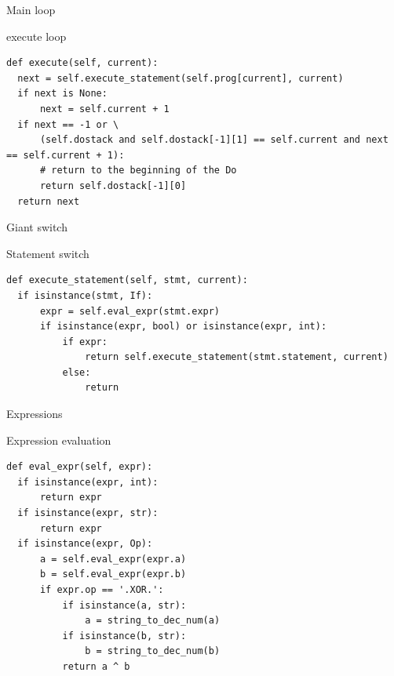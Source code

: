 \documentclass{beamer}
\def\py{
  \lstset{
     language=Python,
     extendedchars=true,
     basicstyle=\footnotesize\ttfamily,
     showstringspaces=false,
     showspaces=false,
     numbersep=9pt,
     tabsize=2,
     breaklines=true,
     showtabs=false,
     captionpos=b
  }
}
\begin{document}
\begin{frame}[fragile]{Main loop}

\begin{block}{execute loop}
\py
\begin{lstlisting}
def execute(self, current):
  next = self.execute_statement(self.prog[current], current)
  if next is None:
      next = self.current + 1
  if next == -1 or \
      (self.dostack and self.dostack[-1][1] == self.current and next == self.current + 1):
      # return to the beginning of the Do
      return self.dostack[-1][0]
  return next
\end{lstlisting}
\end{block}
\end{frame}

\begin{frame}[fragile]{Giant switch}

\begin{block}{Statement switch}
\py
\begin{lstlisting}
def execute_statement(self, stmt, current):
  if isinstance(stmt, If):
      expr = self.eval_expr(stmt.expr)
      if isinstance(expr, bool) or isinstance(expr, int):
          if expr:
              return self.execute_statement(stmt.statement, current)
          else:
              return
\end{lstlisting}
\end{block}
\end{frame}

\begin{frame}[fragile]{Expressions}

\begin{block}{Expression evaluation}
\py
\begin{lstlisting}
def eval_expr(self, expr):
  if isinstance(expr, int):
      return expr
  if isinstance(expr, str):
      return expr
  if isinstance(expr, Op):
      a = self.eval_expr(expr.a)
      b = self.eval_expr(expr.b)
      if expr.op == '.XOR.':
          if isinstance(a, str):
              a = string_to_dec_num(a)
          if isinstance(b, str):
              b = string_to_dec_num(b)
          return a ^ b
\end{lstlisting}
\end{block}
\end{frame}
\end{document}
